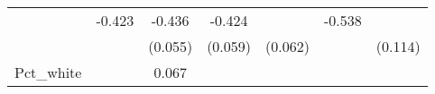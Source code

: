 \documentclass[12pt,twoside]{reedthesis}
\begin{document}
\begin{longtable}[]{@{}ccccccc@{}}
\begin{minipage}[t]{0.10\columnwidth}
  \strut
  \end{minipage} & \begin{minipage}[t]{0.11\columnwidth}\centering\strut
  -0.423\strut
  \end{minipage} & \begin{minipage}[t]{0.11\columnwidth}\centering\strut
  -0.436\strut
  \end{minipage} & \begin{minipage}[t]{0.11\columnwidth}\centering\strut
  -0.424\strut
  \end{minipage} & \begin{minipage}[t]{0.11\columnwidth}\centering\strut
  \strut
  \end{minipage} & \begin{minipage}[t]{0.12\columnwidth}\centering\strut
  -0.538\strut
  \end{minipage}\tabularnewline
  \begin{minipage}[t]{0.14\columnwidth}\centering\strut
  \strut
  \end{minipage} & \begin{minipage}[t]{0.10\columnwidth}\centering\strut
  \strut
  \end{minipage} & \begin{minipage}[t]{0.11\columnwidth}\centering\strut
  (0.055)\strut
  \end{minipage} & \begin{minipage}[t]{0.11\columnwidth}\centering\strut
  (0.059)\strut
  \end{minipage} & \begin{minipage}[t]{0.11\columnwidth}\centering\strut
  (0.062)\strut
  \end{minipage} & \begin{minipage}[t]{0.11\columnwidth}\centering\strut
  \strut
  \end{minipage} & \begin{minipage}[t]{0.12\columnwidth}\centering\strut
  (0.114)\strut
  \end{minipage}\tabularnewline
  \begin{minipage}[t]{0.14\columnwidth}\centering\strut
  Pct\_white\strut
  \end{minipage} & \begin{minipage}[t]{0.10\columnwidth}\centering\strut
  \strut
  \end{minipage} & \begin{minipage}[t]{0.11\columnwidth}\centering\strut
  0.067\strut
  \end{minipage} & \begin{minipage}[t]{0.11\columnwidth}\centering\strut

\end{minipage}
\end{longtable}
\end{document}
